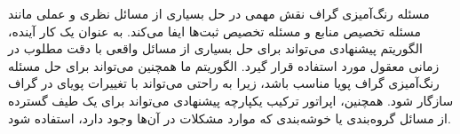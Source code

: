 \documentclass[a4paper,10pt]{article}
\begin{document}
        مسئله رنگ‌آمیزی گراف نقش مهمی در حل بسیاری از مسائل نظری و عملی مانند مسئله تخصیص منابع و مسئله تخصیص ثبت‌ها ایفا می‌کند. به عنوان یک کار آینده، الگوریتم پیشنهادی می‌تواند برای حل بسیاری از مسائل واقعی با دقت مطلوب در زمانی معقول مورد استفاده قرار گیرد. الگوریتم ما همچنین می‌تواند برای حل مسئله رنگ‌آمیزی گراف پویا مناسب باشد، زیرا به راحتی می‌تواند با تغییرات پویای در گراف سازگار شود. همچنین، اپراتور ترکیب یکپارچه پیشنهادی می‌تواند برای یک طیف گسترده از مسائل گروه‌بندی یا خوشه‌بندی که موارد مشکلات در آن‌ها وجود دارد، استفاده شود.

            
\end{document}
